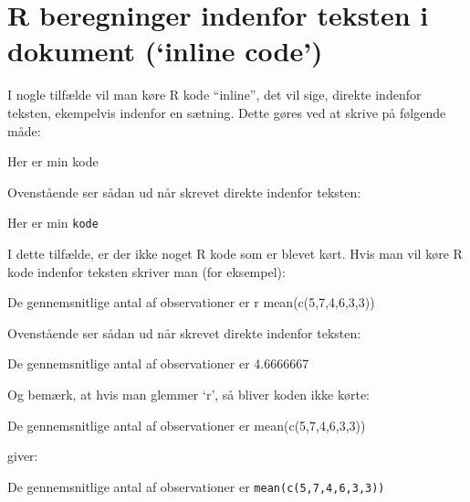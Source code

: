 \documentclass[
]{book}
\newenvironment{Shaded}{\begin{snugshade}}{\end{snugshade}}
\newcommand{\AttributeTok}[1]{\textcolor[rgb]{0.77,0.63,0.00}{#1}}
\newcommand{\NormalTok}[1]{#1}
\newcommand{\StringTok}[1]{\textcolor[rgb]{0.31,0.60,0.02}{#1}}
\begin{document}
\hypertarget{r-beregninger-indenfor-teksten-i-dokument-inline-code}{%
\section{R beregninger indenfor teksten i dokument (`inline code')}\label{r-beregninger-indenfor-teksten-i-dokument-inline-code}}

I nogle tilfælde vil man køre R kode ``inline'', det vil sige, direkte indenfor teksten, ekempelvis indenfor en sætning. Dette gøres ved at skrive på følgende måde:

\begin{Shaded}
\begin{Highlighting}[]
\NormalTok{Her er min }\StringTok{\textasciigrave{}}\AttributeTok{kode}\StringTok{\textasciigrave{}}
\end{Highlighting}
\end{Shaded}

Ovenstående ser sådan ud når skrevet direkte indenfor teksten:

Her er min \texttt{kode}

I dette tilfælde, er der ikke noget R kode som er blevet kørt. Hvis man vil køre R kode indenfor teksten skriver man (for eksempel):

\begin{Shaded}
\begin{Highlighting}[]
\NormalTok{De gennemsnitlige antal af observationer er }\StringTok{\textasciigrave{}}\AttributeTok{r mean(c(5,7,4,6,3,3))}\StringTok{\textasciigrave{}}
\end{Highlighting}
\end{Shaded}

Ovenstående ser sådan ud når skrevet direkte indenfor teksten:

De gennemsnitlige antal af observationer er 4.6666667

Og bemærk, at hvis man glemmer `r', så bliver koden ikke kørte:

\begin{Shaded}
\begin{Highlighting}[]
\NormalTok{De gennemsnitlige antal af observationer er }\StringTok{\textasciigrave{}}\AttributeTok{mean(c(5,7,4,6,3,3))}\StringTok{\textasciigrave{}}
\end{Highlighting}
\end{Shaded}

giver:

De gennemsnitlige antal af observationer er \texttt{mean(c(5,7,4,6,3,3))}
\end{document}

